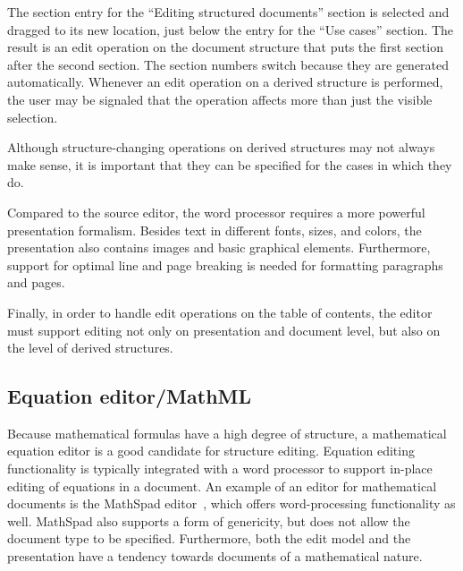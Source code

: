 \documentclass{speauth}
\begin{document}
The section entry for the ``Editing structured documents'' section is selected and dragged to its new location, just below the entry for the ``Use cases'' section. The result is an edit operation on the document structure that puts the first section after the second section. The section numbers switch because they are generated automatically. Whenever an edit operation on a derived structure is performed, the user may be signaled that the operation affects more than just the visible selection.

Although structure-changing operations on derived structures may not always make sense, it is important that they can be specified for the cases in which they do.


Compared to the source editor, the word processor requires a more powerful presentation formalism. Besides text in different fonts, sizes, and colors, the presentation also contains images and basic graphical elements. Furthermore, support for optimal line and page breaking is needed for formatting paragraphs and pages. 

Finally, in order to handle edit operations on the table of contents, the editor must support editing not only on presentation and document level, but also on the level of derived structures.


%																
\subsection{Equation editor/MathML}  

Because mathematical formulas have a high degree of structure, a mathematical equation editor is a good candidate for structure editing. Equation editing functionality is typically integrated with a word processor to support in-place editing of equations in a document. An example of an editor for mathematical documents is the MathSpad editor~\cite{verhoeven00mathspad}, which offers word-processing functionality as well. MathSpad also supports a form of genericity, but does not allow the document type to be specified. Furthermore, both the edit model and the presentation have a tendency towards documents of a mathematical nature.



\end{document}
